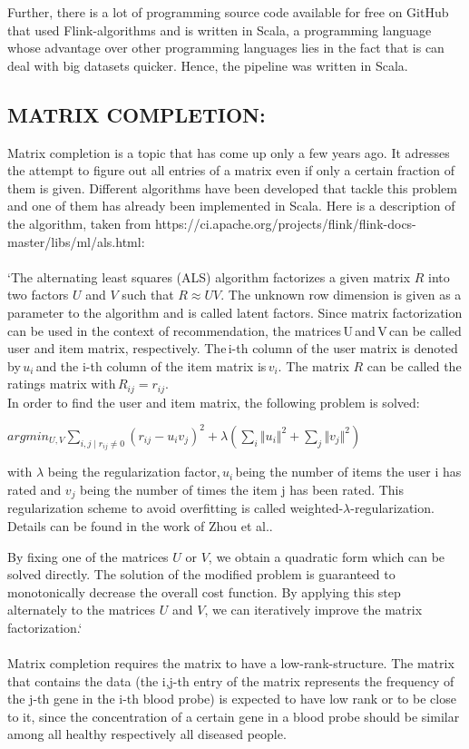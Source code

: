 \documentclass{bioinfo}
\begin{document}
Further, there is a lot of programming source code available for free on GitHub that used Flink-algorithms and is written in Scala, a programming language whose advantage over other programming languages lies in the fact that is can deal with big datasets quicker. Hence, the pipeline was written in Scala.\\

 

\subsection{MATRIX COMPLETION: }

  

Matrix completion is a topic that has come up only a few years ago. It adresses the attempt to figure out all entries of a matrix even if only a certain fraction of them is given. Different algorithms have been developed that tackle this problem and one of them has already been implemented in Scala. Here is a description of the algorithm, taken from https://ci.apache.org/projects/flink/flink-docs-master/libs/ml/als.html: \\\\
`The alternating least squares (ALS) algorithm factorizes a given matrix $R$ into two factors $U$ and $V$ such that $R\approx UV$. The unknown row dimension is given as a parameter to the algorithm and is called latent factors. Since matrix factorization can be used in the context of recommendation, the matrices U and V can be called user and item matrix, respectively. The i-th column of the user matrix is denoted by $u_i$ and the i-th column of the item matrix is $v_i$. The matrix $R$ can be called the ratings matrix with $R_{ij} =r_{ij}$.\\
In order to find the user and item matrix, the following problem is solved: 

$ argmin_{U,V} \sum_{i,j\mid r_{ij} \neq0}(r_{ij}−u_i v_j)^{2}+\lambda(\sum_i \Vert u_i\Vert ^{2}+\sum_j \Vert v_j \Vert ^{2}) $

with $\lambda$ being the regularization factor, $u_i$ being the number of items the user i has rated and $v_j$ being the number of times the item j has been rated. This regularization scheme to avoid overfitting is called weighted-$\lambda$-regularization. Details can be found in the work of Zhou et al.. 

By fixing one of the matrices $U$ or $V$, we obtain a quadratic form which can be solved directly. The solution of the modified problem is guaranteed to monotonically decrease the overall cost function. By applying this step alternately to the matrices $U$ and $V$, we can iteratively improve the matrix factorization.`\\\\
Matrix completion requires the matrix to have a low-rank-structure. The matrix that contains the data (the i,j-th entry of the matrix represents the frequency of the j-th gene in the i-th blood probe) is expected to have low rank or to be close to it, since the concentration of a certain gene in a blood probe should be similar among all healthy respectively all diseased people. 
\end{document}
